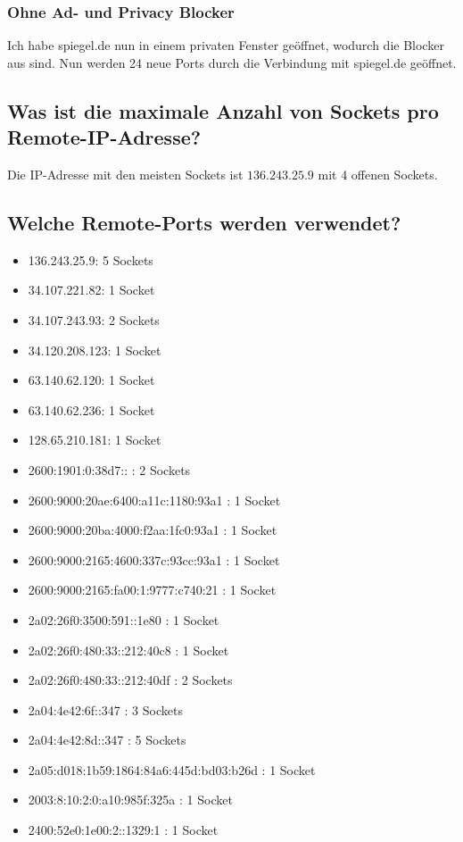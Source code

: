 \documentclass{kdiartcl}
\begin{document}
\subsubsection{Ohne Ad- und Privacy Blocker}
Ich habe spiegel.de nun in einem privaten Fenster geöffnet, wodurch die Blocker aus sind. Nun werden 24 neue Ports durch die Verbindung mit spiegel.de geöffnet.
\subsection{Was ist die maximale Anzahl von Sockets pro Remote-IP-Adresse?}
Die IP-Adresse mit den meisten Sockets ist $136.243.25.9$ mit 4 offenen Sockets.
\subsection{Welche Remote-Ports werden verwendet?}
\begin{itemize}
    \item 136.243.25.9: 5 Sockets
    \item 34.107.221.82: 1 Socket
    \item 34.107.243.93: 2 Sockets
    \item 34.120.208.123: 1 Socket
    \item 63.140.62.120: 1 Socket
    \item 63.140.62.236: 1 Socket
    \item 128.65.210.181: 1 Socket
    \item 2600:1901:0:38d7:: : 2 Sockets
    \item 2600:9000:20ae:6400:a11c:1180:93a1 : 1 Socket
    \item 2600:9000:20ba:4000:f2aa:1fc0:93a1 : 1 Socket
    \item 2600:9000:2165:4600:337c:93cc:93a1 : 1 Socket
    \item 2600:9000:2165:fa00:1:9777:c740:21 : 1 Socket
    \item 2a02:26f0:3500:591::1e80 : 1 Socket
    \item 2a02:26f0:480:33::212:40c8 : 1 Socket
    \item 2a02:26f0:480:33::212:40df : 2 Sockets
    \item 2a04:4e42:6f::347 : 3 Sockets
    \item 2a04:4e42:8d::347 : 5 Sockets
    \item 2a05:d018:1b59:1864:84a6:445d:bd03:b26d : 1 Socket
    \item 2003:8:10:2:0:a10:985f:325a : 1 Socket
    \item 2400:52e0:1e00:2::1329:1 : 1 Socket
\end{itemize}
\end{document}
